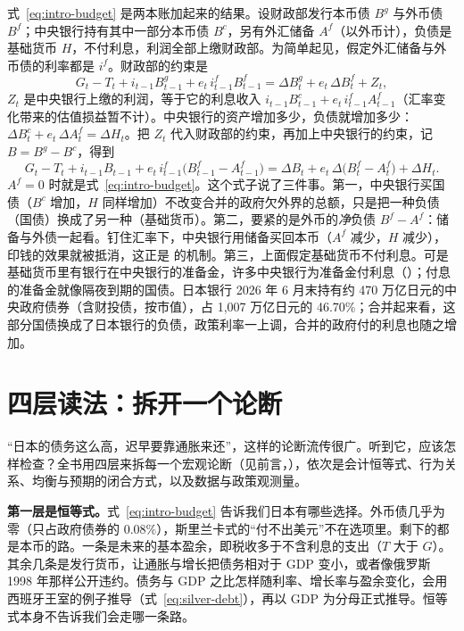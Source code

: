 \begin{deeper}[把中央银行并进政府]
式~\eqref{eq:intro-budget} 是两本账加起来的结果。设财政部发行本币债 $B^{g}$ 与外币债 $B^{f}$；中央银行持有其中一部分本币债 $B^{c}$，另有外汇储备 $A^{f}$（以外币计），负债是基础货币 $H$，不付利息，利润全部上缴财政部。为简单起见，假定外汇储备与外币债的利率都是 $i^{f}$。财政部的约束是
\[
G_t-T_t+i_{t-1}B^{g}_{t-1}+e_t\,i^{f}_{t-1}B^{f}_{t-1}=\Delta B^{g}_t+e_t\,\Delta B^{f}_t+Z_t,
\]
$Z_t$ 是中央银行上缴的利润，等于它的利息收入 $i_{t-1}B^{c}_{t-1}+e_t\,i^{f}_{t-1}A^{f}_{t-1}$（汇率变化带来的估值损益暂不计）。中央银行的资产增加多少，负债就增加多少：$\Delta B^{c}_t+e_t\,\Delta A^{f}_t=\Delta H_t$。把 $Z_t$ 代入财政部的约束，再加上中央银行的约束，记 $B=B^{g}-B^{c}$，得到
\[
G_t-T_t+i_{t-1}B_{t-1}+e_t\,i^{f}_{t-1}\bigl(B^{f}_{t-1}-A^{f}_{t-1}\bigr)=\Delta B_t+e_t\,\Delta\bigl(B^{f}_t-A^{f}_t\bigr)+\Delta H_t .
\]
$A^{f}=0$ 时就是式~\eqref{eq:intro-budget}。这个式子说了三件事。第一，中央银行买国债（$B^{c}$ 增加，$H$ 同样增加）不改变合并的政府欠外界的总额，只是把一种负债（国债）换成了另一种（基础货币）。第二，要紧的是外币的\emph{净}负债 $B^{f}-A^{f}$：储备与外债一起看。钉住汇率下，中央银行用储备买回本币（$A^{f}$ 减少，$H$ 减少），印钱的效果就被抵消，这正是 的机制。第三，上面假定基础货币不付利息。可是基础货币里有银行在中央银行的准备金，许多中央银行为准备金付利息（）；付息的准备金就像隔夜到期的国债。日本银行 2026 年 6 月末持有约 470 万亿日元的中央政府债券（含财投债，按市值），占 1,007 万亿日元的 46.70\%\cite{boj2026ff}；合并起来看，这部分国债换成了日本银行的负债，政策利率一上调，合并的政府付的利息也随之增加。
\end{deeper}

\section{四层读法：拆开一个论断}\label{sec:intro-layers}

“日本的债务这么高，迟早要靠通胀来还”，这样的论断流传很广。听到它，应该怎样检查？全书用四层来拆每一个宏观论断（见前言，），依次是会计恒等式、行为关系、均衡与预期的闭合方式，以及数据与政策观测量。

\textbf{第一层是恒等式。}式~\eqref{eq:intro-budget} 告诉我们日本有哪些选择。外币债几乎为零（只占政府债券的 0.08\%），斯里兰卡式的“付不出美元”不在选项里。剩下的都是本币的路。一条是未来的基本盈余，即税收多于不含利息的支出（$T$ 大于 $G$）。其余几条是发行货币，让通胀与增长把债务相对于 GDP 变小，或者像俄罗斯 1998 年那样公开违约。债务与 GDP 之比怎样随利率、增长率与盈余变化，会用西班牙王室的例子推导（式~\eqref{eq:silver-debt}），再以 GDP 为分母正式推导。恒等式本身不告诉我们会走哪一条路。

